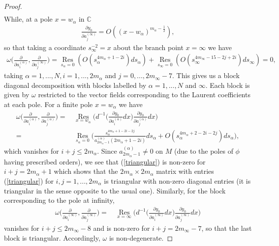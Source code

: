 \documentclass[10pt,a4paper]{amsart}
\begin{document}
\begin{proof}
\begin{align}
\end{align}
While,  at a pole $x = w_\alpha$ in $\mathbb{C}$ 
\begin{align}\label{order_diff_inf_2}
\frac{\partial y_0}{\partial a_j^{(\infty)}} = O((x-w_\alpha)^{m_\alpha - \frac{1}{2}}),
\end{align}
so that taking a coordinate $s_\infty^{-2} = x$ about the branch point $x = \infty$ we have 
\begin{align}
\omega\bigg(\frac{\partial }{\partial a_i^{(\alpha)}},  \frac{\partial }{\partial a_j^{(\infty)}} \bigg) = \underset{s_\alpha=0}{\operatorname{Res}}(O(s_\alpha^{4m_\alpha+1-2i})ds_\alpha) + \underset{s_\infty = 0}{\operatorname{Res}}(O(s_\infty^{4m_\infty - 15 - 2j + 2i})ds_\infty)=0,
\end{align}
taking $\alpha = 1,...,N,  i = 1,...,2m_\alpha$ and $j = 0,..., 2m_\infty - 7$.  This gives us a block diagonal decomposition with blocks labelled by $\alpha = 1,...,N$ and $\infty$.  Each block is given by $\omega$ restricted to the vector fields corresponding to the Laurent coefficients at each pole.  For a finite pole $x = w_\alpha$ we have
\begin{align}\label{triangular}
\omega\bigg(\frac{\partial }{\partial a_i^{(\alpha)}},  \frac{\partial }{\partial a_j^{(\alpha)}} \bigg) \nonumber = \,  &\underset{x = w_\alpha}{\operatorname{Res}} \bigg(  d^{-1} \bigg( \frac{\partial y_0}{\partial a_i^{(\alpha)}}  dx \bigg)  \frac{\partial y_0}{\partial a_j^{(\alpha)}} dx \bigg) \\ = \,  &\underset{s_\alpha = 0}{\operatorname{Res}}\bigg( \frac{s_\alpha^{4m_\alpha+1-2i-2j}}{a^{(\alpha)}_{2m_\alpha-1}(2m_\alpha+1-2i)}ds_\alpha+ O(s_\alpha^{4m_\alpha+2-2i-2j})ds_\alpha\bigg),  
\end{align}
which vanishes for $i + j \le 2m_\alpha$.  Since $a_{2m_\alpha-1}^{(\alpha)} \ne 0$ on $M$ (due to the poles of $\phi$ having prescribed orders),  we see that (\ref{triangular}) is non-zero for $i + j = 2m_\alpha + 1$ which shows that the $2m_\alpha \times 2m_\alpha$ matrix with entries (\ref{triangular}) for $i,j = 1,...,2m_\alpha$ is triangular with non-zero diagonal entries (it is triangular in the sense opposite to the usual one). 
Similarly,  for the block corresponding to the pole at infinity,  
\begin{align}\label{triangular_inf}
\omega\bigg(\frac{\partial }{\partial a_i^{(\infty)}},  \frac{\partial }{\partial a_j^{(\infty)}} \bigg) = \,  &\underset{x = \infty}{\operatorname{Res}} \bigg( d^{-1} \bigg( \frac{\partial y_0}{\partial a_i^{(\infty)}}  dx \bigg)  \frac{\partial y_0}{\partial a_j^{(\infty)}} dx \bigg) 
\end{align}
vanishes for $i + j \le 2m_\infty-8$ and is non-zero for $i + j = 2m_\infty - 7$,  so that the last block is triangular.  
Accordingly,  $\omega$ is non-degenerate.  
\end{proof}
\end{document}
